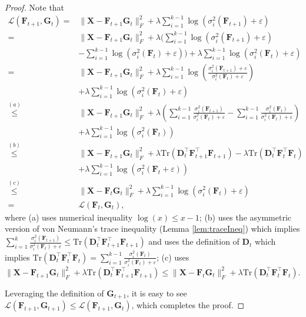 \documentclass[journal]{IEEEtran}
\begin{document}
\begin{proof}
	Note that
	\[
	\begin{aligned}
	\mathcal{L}(\mathbf{F}_{t+1}, \mathbf{G}_{t}) 
	=&\|\mathbf{X}-\mathbf{F}_{t+1}\mathbf{G}_t\|_F^2 +\lambda \sum_{i=1}^{k-1} \log(\sigma_i^2 (\mathbf{F}_{t+1})+\varepsilon) \\
	=&  \|\mathbf{X}-\mathbf{F}_{t+1}\mathbf{G}_t\|_F^2  + \lambda(\sum_{i=1}^{k-1} \log(\sigma_i^2 (\mathbf{F}_{t+1})+\varepsilon) \\
	&- \sum_{i=1}^{k-1} \log(\sigma_i^2 (\mathbf{F}_{t})+\varepsilon)) + \lambda\sum_{i=1}^{k-1} \log(\sigma_i^2 (\mathbf{F}_{t})+\varepsilon) \\
	=&  \|\mathbf{X}-\mathbf{F}_{t+1}\mathbf{G}_t\|_F^2 +\lambda \sum_{i=1}^{k-1} \log( \frac{\sigma_i^2 (\mathbf{F}_{t+1})+\varepsilon}{\sigma_i^2 (\mathbf{F}_{t})+\varepsilon}) \\
	&+ \lambda\sum_{i=1}^{k-1} \log(\sigma_i^2 (\mathbf{F}_{t})+\varepsilon)  \\
	\overset{(a)}{\leq}&  \|\mathbf{X}-\mathbf{F}_{t+1}\mathbf{G}_t\|_F^2 +\lambda \left( \sum_{i=1}^{k-1} \frac{\sigma_i^2 (\mathbf{F}_{t+1})}{\sigma_i^2 (\mathbf{F}_{t})+\varepsilon} - \sum_{i=1}^{k-1} \frac{\sigma_i^2 (\mathbf{F}_{t})}{\sigma_i^2 (\mathbf{F}_{t})+\varepsilon}\right) \\
	&+ \lambda\sum_{i=1}^{k-1} \log\left(\sigma_i^2 (\mathbf{F}_{t})\right)  \\
	\overset{(b)}{\leq}&  \|\mathbf{X}-\mathbf{F}_{t+1}\mathbf{G}_t\|_F^2 +\lambda  \text{Tr}(\mathbf{D}_t^\top \mathbf{F}_{t+1}^\top \mathbf{F}_{t+1}) - \lambda \text{Tr}(\mathbf{D}_t^\top \mathbf{F}_{t}^\top \mathbf{F}_{t}) \\
	&+ \lambda\sum_{i=1}^{k-1} \log\left(\sigma_i^2 (\mathbf{F}_{t}+\varepsilon)\right)  \\
	\overset{(c)}{\leq}& \|\mathbf{X}-\mathbf{F}_{t}\mathbf{G}_t\|_F^2 + \lambda\sum_{i=1}^{k-1} \log\left(\sigma_i^2 (\mathbf{F}_{t})+\varepsilon\right) \\
	=& \mathcal{L}(\mathbf{F}_{t}, \mathbf{G}_{t}),
	\end{aligned}
	\]
	where (a) uses numerical inequality $\log(x)\leq x - 1$; (b) uses the asymmetric version of von Neumann's trace inequality (Lemma \ref{lem:traceIneq}) which implies 
	$\sum_{i=1}^k \frac{\sigma_i^2 (\mathbf{F}_{t+1})}{\sigma_i^2 (\mathbf{F}_{t})+\varepsilon} \leq \text{Tr}(\mathbf{D}_t^\top \mathbf{F}_{t+1}^\top \mathbf{F}_{t+1})$ and uses the definition of $\mathbf{D}_t$ which implies $\text{Tr}(\mathbf{D}_t^\top \mathbf{F}_{t}^\top \mathbf{F}_{t})=\sum_{i=1}^{k-1} \frac{\sigma_i^2 (\mathbf{F}_{t})}{\sigma_i^2 (\mathbf{F}_{t})+\varepsilon}$; (c) uses  $\|\mathbf{X}-\mathbf{F}_{t+1}\mathbf{G}_t\|_F^2 +\lambda  \text{Tr}(\mathbf{D}_t^\top \mathbf{F}_{t+1}^\top \mathbf{F}_{t+1})\leq \|\mathbf{X}-\mathbf{F}_{t}\mathbf{G}_t\|_F^2 +\lambda \text{Tr}(\mathbf{D}_t^\top \mathbf{F}_{t}^\top \mathbf{F}_{t})$.
	
	Leveraging the definition of $\mathbf{G}_{t+1}$, it is easy to see $\mathcal{L}(\mathbf{F}_{t+1}, \mathbf{G}_{t+1}) \leq \mathcal{L}(\mathbf{F}_{t+1}, \mathbf{G}_{t})$, which completes the proof.
\end{proof}
\end{document}
